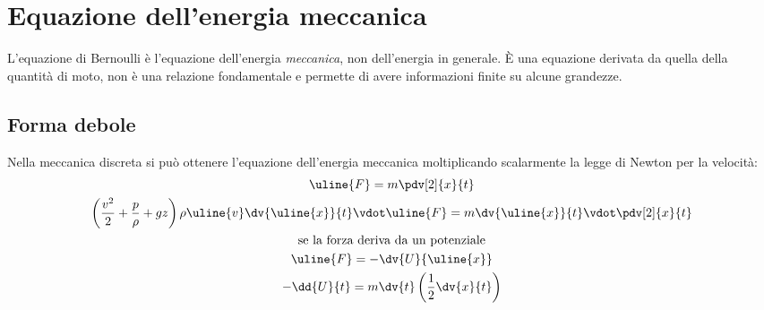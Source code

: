 %
\section{Equazione dell'energia meccanica}
L'equazione di Bernoulli è l'equazione dell'energia \textit{meccanica}, non dell'energia in generale. 
È una equazione derivata da quella della quantità di moto, non è una relazione fondamentale e permette di avere informazioni finite su alcune grandezze. 

\subsection{Forma debole}
Nella meccanica discreta si può ottenere l'equazione dell'energia meccanica moltiplicando scalarmente la legge di Newton per la velocità:
%
	\begin{equation*}
		\begin{gathered}
			\uline{F} = m \pdv[2]{x}{t}\\\left(\frac{v^2}{2} + \frac{p}{\rho} + gz \right) \rho \uline{v}
			\dv{\uline{x}}{t} \vdot \uline{F} = m \dv{\uline{x}}{t} \vdot \pdv[2]{x}{t}\\
			\text{se la forza deriva da un potenziale}\\
			\uline{F} = - \dv{U}{\uline{x}}\\
			- \dd{U}{t} = m \dv{t} \left( \frac{1}{2} \dv{x}{t} \right)\\
		\end{gathered}
	\end{equation*}
%

